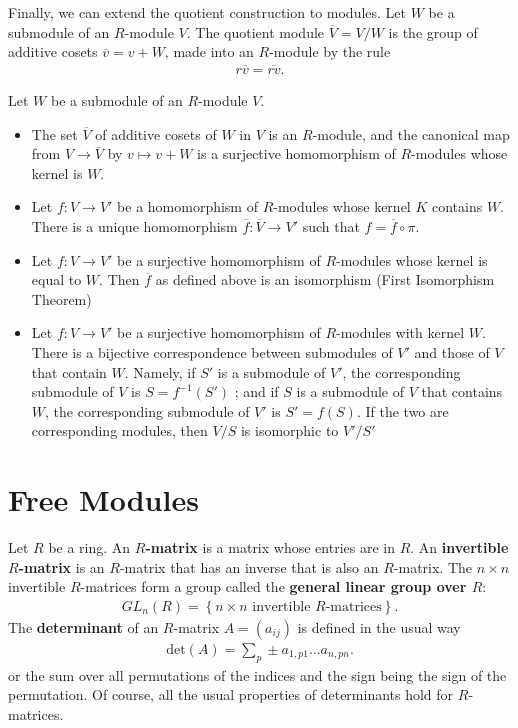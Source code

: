 \documentclass{memoir}
\begin{document}
Finally, we can extend the quotient construction to modules. Let \(W\) be a submodule of an \(R\)-module \(V\). The quotient module \(\overline{V}= V / W\) is the group of additive cosets \(\overline{v} = v+W\), made into an \(R\)-module by the rule
\begin{align*}
	r \overline{v} = \overline{rv}.
\end{align*}
\begin{thm}
	Let \(W\) be a submodule of an \(R\)-module \(V\).
	\begin{itemize}
		\item The set \(\overline{V}\) of additive cosets of \(W\) in \(V\) is an \(R\)-module, and the canonical map from \(V\to \overline{V}\) by \(v\mapsto v+W\) is a surjective homomorphism of \(R\)-modules whose kernel is \(W\).
		\item Let \(f:V\to V'\) be a homomorphism of \(R\)-modules whose kernel \(K\) contains \(W\). There is a unique homomorphism \(\overline{f}:\overline{V}\to V'\) such that \(f = \overline{f}\circ \pi\).
		\item Let \(f:V\to V'\) be a surjective homomorphism of \(R\)-modules whose kernel is equal to \(W\). Then \(\overline{f}\) as defined above is an isomorphism (First Isomorphism Theorem)
		\item Let \(f:V \to V'\) be a surjective homomorphism of \(R \)-modules with kernel \(W\). There is a bijective correspondence between submodules of \(V'\) and those of \(V\) that contain \(W\). Namely, if \(S'\) is a submodule of \(V'\), the corresponding submodule of \(V\) is \(S = f^{-1}(S')\) ; and if \(S\) is a submodule of \(V\) that contains \(W\), the corresponding submodule of \(V'\) is \(S' = f(S)\). If the two are corresponding modules, then \(V / S\) is isomorphic to \(V' / S'\)
	\end{itemize}
\end{thm}

\section{Free Modules}
\label{sec:free_modules}

\begin{defn}[R-Matrix]
	Let \(R\) be a ring. An \textbf{\(R\)-matrix} is a matrix whose entries are in \(R\). An \textbf{invertible \(R\)-matrix} is an \(R\)-matrix that has an inverse that is also an \(R\)-matrix. The \(n \times n\) invertible \(R\)-matrices form a group called the \textbf{general linear group over \(R\)}:
	\begin{align*}
		GL_n(R) = \left\{n\times n \text{ invertible \(R\)-matrices} \right\} .
	\end{align*}
	The \textbf{determinant} of an \(R\)-matrix \(A = (a_{ij})\) is defined in the usual way
	\begin{align*}
		\textrm{det}(A) = \sum_{p} \pm a_{1,p 1}\ldots a_{n, pn}.
	\end{align*}
	or the sum over all permutations of the indices and the sign being the sign of the permutation. Of course, all the usual properties of determinants hold for \(R\)-matrices.
\end{defn}
\end{document}
